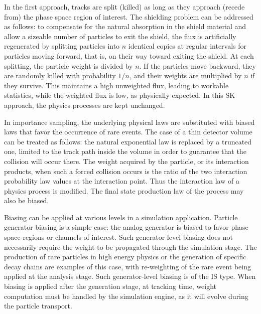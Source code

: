 In the first approach, tracks are split (killed) as long as they approach
(recede from) the phase space region of interest.  The shielding problem can be 
addressed as follows: to compensate for the natural absorption in the shield 
material and allow a sizeable number of particles to exit the shield, the flux
is artificially regenerated by splitting particles into $n$ identical copies at
regular intervals for particles moving forward, that is, on their way toward 
exiting the shield.  At each splitting, the particle weight is divided by $n$. 
If the particles move backward, they are randomly killed with probability $1/n$,
and their weights are multiplied by $n$ if they survive.  This maintains a 
high unweighted flux, leading to workable statistics, while the weighted flux
is low, as physically expected.  In this SK approach, the physics processes
are kept unchanged.

In importance sampling, the underlying physical laws are substituted with biased
laws that favor the occurrence of rare events.  The case of a thin detector 
volume can be treated as follows: the natural exponential law is replaced by a
truncated one, limited to the track path inside the volume in order to guarantee
that the collision will occur there.  The weight acquired by the particle, or 
its interaction products, when such a forced collision occurs is the ratio of 
the two interaction probability law values at the interaction point.  Thus the 
interaction law of a physics process is modified.  The final state production 
law of the process may also be biased.

Biasing can be applied at various levels in a simulation application.  Particle
generator biasing is a simple case: the analog generator is biased to favor 
phase space regions or channels of interest.  Such generator-level biasing does 
not necessarily require the weight to be propagated through the simulation stage.
The production of rare particles in high energy physics or the generation of 
specific decay chains are examples of this case, with re-weighting of the rare 
event being applied at the analysis stage.  Such generator-level biasing is of
the IS type.  When biasing is applied after the generation stage, at tracking 
time, weight computation must be handled by the simulation engine, as it will 
evolve during the particle transport.

